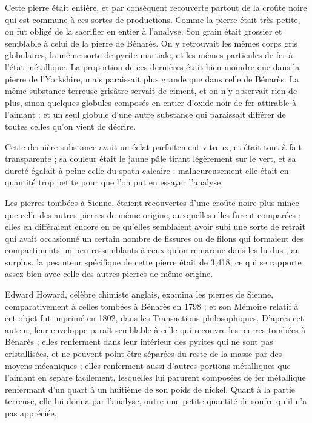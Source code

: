 \documentclass[a4paper, 12pt, oneside, french]{article}
\begin{document}
Cette pierre était entière, et par conséquent recouverte partout de la croûte noire qui est commune à ces sortes de productions. Comme la pierre était très-petite, on fut obligé de la sacrifier en entier à l'analyse. Son grain était grossier et semblable à celui de la pierre de Bénarès. On y retrouvait les mêmes corps gris globulaires, la même sorte de pyrite martiale, et les mêmes particules de fer à l'état métallique. La proportion de ces dernières était bien moindre que dans la pierre de l'Yorkshire, mais paraissait plus grande que dans celle de Bénarès. La même substance terreuse grisâtre servait de ciment, et on n'y observait rien de plus, sinon quelques globules composés en entier d'oxide noir de fer attirable à l'aimant ; et un seul globule d'une autre substance qui paraissait différer de toutes celles qu'on vient de décrire.

Cette dernière substance avait un éclat parfaitement vitreux, et était tout-à-fait transparente ; sa couleur était le jaune pâle tirant légèrement sur le vert, et sa dureté égalait à peine celle du spath calcaire : malheureusement elle était en quantité trop petite pour que l'on put en essayer l'analyse.

Les pierres tombées à Sienne, étaient recouvertes d'une croûte noire plus mince que celle des autres pierres de même origine, auxquelles elles furent comparées ; elles en différaient encore en ce qu'elles semblaient avoir subi une sorte de retrait qui avait occasionné un certain nombre de fissures ou de filons qui formaient des compartiments un peu ressemblants à ceux qu'on remarque dans les lu dus ; au surplus, la pesanteur spécifique de cette pierre était de 3,418, ce qui se rapporte assez bien avec celle des autres pierres de même origine.

Edward Howard, célèbre chimiste anglais, examina les pierres de Sienne, comparativement à celles tombées à Bénarès en 1798 ; et son Mémoire relatif à cet objet fut imprimé en 1802, dans les Transactions philosophiques. D'après cet auteur, leur enveloppe paraît semblable à celle qui recouvre les pierres tombées à Bénarès ; elles renferment dans leur intérieur des pyrites qui ne sont pas cristallisées, et ne peuvent point être séparées du reste de la masse par des moyens mécaniques ; elles renferment aussi d'autres portions métalliques que l'aimant en sépare facilement, lesquelles lui parurent composées de fer métallique renfermant d'un quart à un huitième de son poids de nickel. Quant à la partie terreuse, elle lui donna par l'analyse, outre une petite quantité de soufre qu'il n'a pas appréciée,
\end{document}
